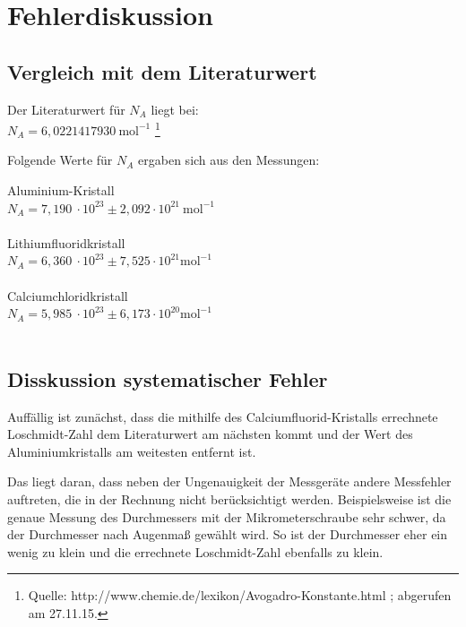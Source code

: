 \documentclass[12pt,a4paper,titlepage,headinclude,bibtotoc]{scrartcl}
\begin{document}
\section{Fehlerdiskussion}

\subsection{Vergleich mit dem Literaturwert}


Der Literaturwert für $N_A$ liegt bei:\\


$  N_A = 6,0221417930 \ \mathrm{mol^{-1}} $ \footnote{Quelle: http://www.chemie.de/lexikon/Avogadro-Konstante.html ; abgerufen am 27.11.15.}

\vspace{3mm}
Folgende Werte für $N_A$ ergaben sich aus den Messungen:\\
\vspace{2.5mm}

 Aluminium-Kristall\\
 \quad $ N_A= 7,190 \ \cdot 10^{23}  \pm 2,092\cdot10^{21} \ \mathrm{mol^{-1}} $\\
   \\
 Lithiumfluoridkristall\\
\quad $ N_A = 6,360 \ \cdot 10^{23} \pm 7,525 \cdot 10^{21} \mathrm{mol^{-1}} $\\
 \\
 Calciumchloridkristall\\
 \quad $N_A = 5,985 \ \cdot 10^{23} \pm 6,173 \cdot 10^{20} \mathrm{mol^{-1}}$\\
 \\
\newpage


\subsection{Disskussion systematischer Fehler}

Auffällig ist zunächst, dass die mithilfe des Calciumfluorid-Kristalls errechnete Loschmidt-Zahl dem Literaturwert am nächsten kommt und der Wert des Aluminiumkristalls am weitesten entfernt ist.

Das liegt daran, dass neben der Ungenauigkeit der Messgeräte andere Messfehler auftreten, die in der Rechnung nicht berücksichtigt werden. Beispielsweise ist die genaue Messung des Durchmessers mit der Mikrometerschraube sehr schwer, da der Durchmesser nach Augenmaß gewählt wird. So ist der Durchmesser eher ein wenig zu klein und die errechnete Loschmidt-Zahl ebenfalls zu klein.\\
\end{document}
